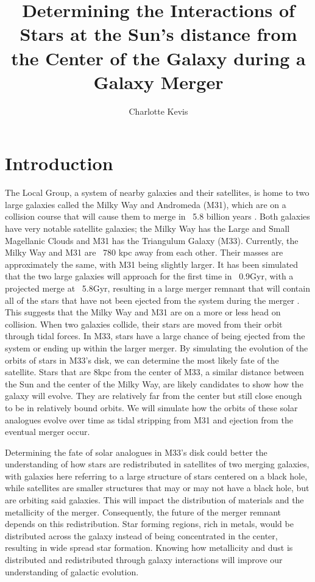 \documentclass{aastex63}
\begin{document}
\title{Determining the Interactions of Stars at the Sun's distance from the Center of the Galaxy during a Galaxy Merger}

\author{Charlotte Kevis}


\section{Introduction} 
The Local Group, a system of nearby galaxies and their satellites, is home to two large galaxies called the Milky Way and Andromeda (M31), which are on a collision course that will cause them to merge in ~5.8 billion years \citep{VDM2012}. Both galaxies have very notable satellite galaxies; the Milky Way has the Large and Small Magellanic Clouds and M31 has the Triangulum Galaxy (M33). Currently, the Milky Way and M31 are ~780 kpc away from each other. Their masses are approximately the same, with M31 being slightly larger. It has been simulated that the two large galaxies will approach for the first time in ~0.9Gyr, with a projected merge at ~5.8Gyr, resulting in a large merger remnant that will contain all of the stars that have not been ejected from the system during the merger \citep{VDM2012}. This suggests that the Milky Way and M31 are on a more or less head on collision. When two galaxies collide, their stars are moved from their orbit through tidal forces. In M33, stars have a large chance of being ejected from the system or ending up within the larger merger. By simulating the evolution of the orbits of stars in M33's disk, we can determine the most likely fate of the satellite. Stars that are 8kpc from the center of M33, a similar distance between the Sun and the center of the Milky Way, are likely candidates to show how the galaxy will evolve. They are relatively far from the center but still close enough to be in relatively bound orbits. We will simulate how the orbits of these solar analogues evolve over time as tidal stripping from M31 and ejection from the eventual merger occur.

Determining the fate of solar analogues in M33's disk could better the understanding of how stars are redistributed in satellites of two merging galaxies, with galaxies here referring to a large structure of stars centered on a black hole, while satellites are smaller structures that may or may not have a black hole, but are orbiting said galaxies. This will impact the distribution of materials and the metallicity of the merger. Consequently, the future of the merger remnant depends on this redistribution. Star forming regions, rich in metals, would be distributed across the galaxy instead of being concentrated in the center, resulting in wide spread star formation. Knowing how metallicity and dust is distributed and redistributed through galaxy interactions will improve our understanding of galactic evolution. 
\end{document}
